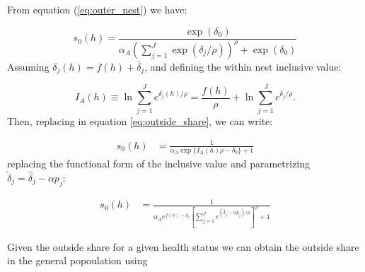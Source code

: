 \documentclass[12pt]{article}
\theoremstyle{plain}
\theoremstyle{plain}
\begin{document}
From equation (\ref{eq:outer_nest}) we have: 

\begin{equation}\label{eq:outside_share}
    s_0(h) = \frac{\exp(\delta_0)}{\alpha_A\left(\sum_{j=1}^J \exp(\delta_j/\rho)\right)^\rho +  \exp \left(\delta_0 \right)}
\end{equation}
Assuming  $\delta_j(h) = f(h) + \bar{\delta}_j$, and defining the within nest inclusive value: 

\[
I_A(h) \equiv \ln \sum_{j=1}^{J} e^{\delta_j(h)/\rho} = \frac{f(h)}{\rho} + \ln \sum_{j=1}^{J} e^{\bar{\delta}_j/\rho}.
\]
Then, replacing in equation \ref{eq:outside_share}, we can write: 


\begin{align}
    s_0(h) %
    &= \frac{1}{\alpha_A\exp\{I_A(h)\rho - \delta_0\} + 1 } 
\end{align}
replacing the functional form of the inclusive value and parametrizing  $\tilde{\delta}_j = \hat{\delta}_j - \alpha p_j$: 

\begin{align}
    s_0(h) %
    &= \frac{1}{\alpha_A e^{f(h) -\delta_0}\left[\sum_{j=1}^{J}e^{(\hat{\delta}_j  - \alpha p_j)/\rho}\right]^\rho + 1 } 
\end{align}


Given the outside share for a given health status we can obtain the outside share in the general popoulation using
\end{document}
